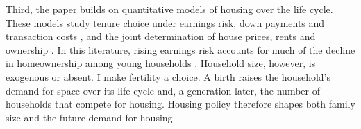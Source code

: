 Third, the paper builds on quantitative models of housing over the life
cycle. These models study tenure choice under earnings risk, down payments
and transaction costs
\citep{fisherGervaisHomeOwnership2011,halketVasudevSaving2014,boarGoreaMidriganLiquidity2022},
and the joint determination of house prices, rents and ownership
\citep{kaplanMitmanViolanteHousing2020,greenwaldGurenCredit2025}. In this
literature, rising earnings risk accounts for much of the decline in
homeownership among young households
\citep{fisherGervaisHomeOwnership2011,pazPardoHomeownership2024}. Household
size, however, is exogenous or absent. I make fertility a choice. A birth
raises the household's demand for space over its life cycle and, a
generation later, the number of households that compete for housing.
Housing policy therefore shapes both family size and the future demand for
housing.
